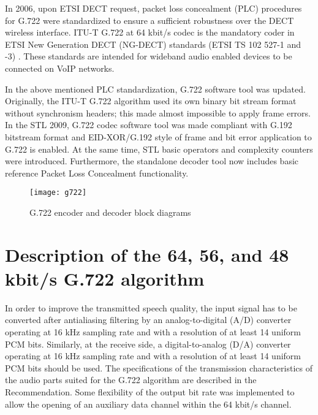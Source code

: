 In 2006, upon ETSI DECT request, packet loss concealment (PLC)
procedures for G.722 were standardized to ensure a sufficient
robustness over the DECT wireless interface. ITU-T G.722 at 64 kbit/s
codec is the mandatory coder in ETSI New Generation DECT (NG-DECT)
standards (ETSI TS 102 527-1 and -3)
\cite{G.722:ETSITS102527-1,G.722:ETSITS102527-3}. These standards are
intended for wideband audio enabled devices to be connected on VoIP
networks.
 
In the above mentioned PLC standardization, G.722 software tool was
updated. Originally, the ITU-T G.722 algorithm used its own binary bit
stream format without synchronism headers; this made almost impossible
to apply frame errors. In the STL 2009, G.722 codec software tool was
made compliant with G.192 bitstream format and EID-XOR/G.192 style of
frame and bit error application to G.722 is enabled. At the same time,
STL basic operators and complexity counters were
introduced. Furthermore, the standalone decoder tool now includes
basic reference Packet Loss Concealment functionality.

\begin{figure}[hbtp]
    \begin{center}
        \texttt{[image: g722]}
  \end{center}
  \caption{G.722 encoder and decoder block diagrams
           \label{fig:G.722-systemic} }
\end{figure}


\section{Description of the 64, 56, and 48 kbit/s G.722 algorithm}

In order to improve the transmitted speech quality, the input signal
has to be converted after antialiasing filtering by an
analog-to-digital (A/D) converter operating at 16 kHz sampling rate
and with a resolution of at least 14 uniform PCM bits. Similarly, at
the receive side, a digital-to-analog (D/A) converter operating at 16
kHz sampling rate and with a resolution of at least 14 uniform PCM
bits should be used. The specifications of the transmission
characteristics of the audio parts suited for the G.722 algorithm are
described in the Recommendation.  Some flexibility of the output bit
rate was implemented to allow the opening of an auxiliary data channel
within the 64 kbit/s channel.


